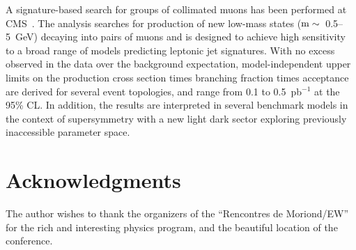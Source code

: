 \documentclass[11pt]{article}
\def\pb{pb$^{-1}$\xspace}
\begin{document}
A signature-based search for groups of collimated muons has been performed at CMS~\cite{CMSPAPER:EXO-11-013}.
The analysis searches for production of new low-mass states ($\rm{m} \sim$~0.5--5~GeV) decaying 
into pairs of muons and is designed to achieve high sensitivity to a broad range of models 
predicting leptonic jet signatures. 
With no excess observed in the data over the background expectation, model-independent 
upper limits on the production cross section times branching fraction times acceptance are 
derived for several event topologies, and range from 0.1 to 0.5~\pb at the 95\% CL. 
In addition, the results are interpreted in several benchmark models 
in the context of supersymmetry with a new light dark sector 
exploring previously inaccessible parameter space. 



\section*{Acknowledgments}
The author wishes to thank the organizers of the ``Rencontres de Moriond/EW'' 
for the rich and interesting physics program, and the beautiful 
location of the conference.
\end{document}
